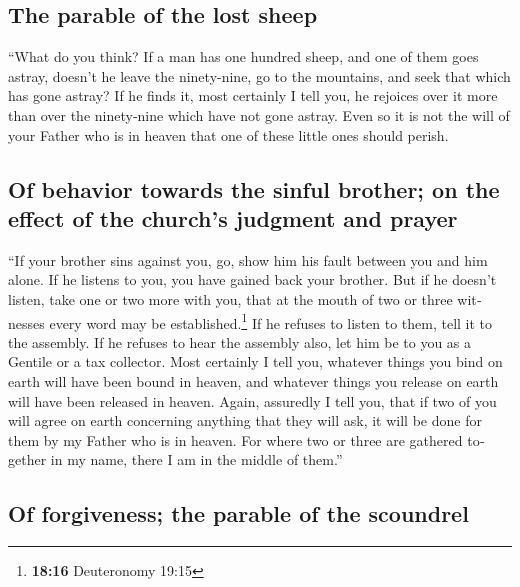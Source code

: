 \begin{paracol}{2}
\begin{otherlanguage}{english}
\hypertarget{the-parable-of-the-lost-sheep}{%
\subsection{The parable of the lost
sheep}\label{the-parable-of-the-lost-sheep}}

 ``What do you think? If a man has one hundred sheep, and
one of them goes astray, doesn't he leave the ninety-nine, go to the
mountains, and seek that which has gone astray?  If he
finds it, most certainly I tell you, he rejoices over it more than over
the ninety-nine which have not gone astray.  Even so it
is not the will of your Father who is in heaven that one of these little
ones should perish.

\hypertarget{of-behavior-towards-the-sinful-brother-on-the-effect-of-the-churchs-judgment-and-prayer}{%
\subsection{Of behavior towards the sinful brother; on the effect of the
church's judgment and
prayer}\label{of-behavior-towards-the-sinful-brother-on-the-effect-of-the-churchs-judgment-and-prayer}}

 ``If your brother sins against you, go, show him his
fault between you and him alone. If he listens to you, you have gained
back your brother.  But if he doesn't listen, take one or
two more with you, that at the mouth of two or three witnesses every
word may be established.\footnote{\textbf{18:16} Deuteronomy 19:15}
 If he refuses to listen to them, tell it to the
assembly. If he refuses to hear the assembly also, let him be to you as
a Gentile or a tax collector.  Most certainly I tell you,
whatever things you bind on earth will have been bound in heaven, and
whatever things you release on earth will have been released in heaven.
 Again, assuredly I tell you, that if two of you will
agree on earth concerning anything that they will ask, it will be done
for them by my Father who is in heaven.  For where two or
three are gathered together in my name, there I am in the middle of
them.''

\hypertarget{of-forgiveness-the-parable-of-the-scoundrel}{%
\subsection{Of forgiveness; the parable of the
scoundrel}\label{of-forgiveness-the-parable-of-the-scoundrel}}


\end{otherlanguage}
\end{paracol}
